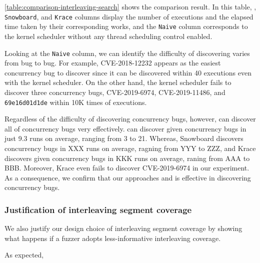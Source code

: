 
%
\autoref{table:comparison-interleaving-search} shows the comparison
result.
%
In this table, \texttt{\sys}, \texttt{Snowboard}, and \texttt{Krace}
columns display the number of executions and the elapsed time taken by
their corresponding works, and the \texttt{Naive} column corresponds
to the kernel scheduler without any thread scheduling control enabled.
%

%
Looking at the \texttt{Naive} column, we can identify the difficulty
of discovering varies from bug to bug.
%
For example, CVE-2018-12232 appears as the easiest concurrency bug to
discover since it can be discovered within 40 executions even with the
kernel scheduler.
%
On the other hand, the kernel scheduler fails to discover three
concurrency bugs, CVE-2019-6974, CVE-2019-11486, and
\texttt{69e16d01d1de} within 10K times of executions.


Regardless of the difficulty of discovering concurrency bugs, however,
\sys can discover all of concurrency bugs very effectively.
%
\sys can discover given concurrency bugs in just 9.3 runs on average,
ranging from 3 to 21.
%
\dr{}Whereas, Snowboard discovers concurrency bugs in XXX runs on
average, ragning from YYY to ZZZ, and Krace discovers given
concurrency bugs in KKK runs on average, raning from AAA to
BBB. Moreover, Krace even fails to discover CVE-2019-6974 in our
experiment.
%
As a consequence, we confirm that our approaches and \sys is effective
in discovering concurrency bugs.




\subsubsection{Justification of interleaving segment coverage}
\label{sss:interleavingcoverage}
%
We also justify our design choice of interleaving segment coverage by
showing what happens if a fuzzer adopts less-informative interleaving
coverage.


%


%
\begin{table}[t]
  \small
  \centering
  
  \caption{}
  \label{table:aliascoverage}
\end{table}


As expected, 










